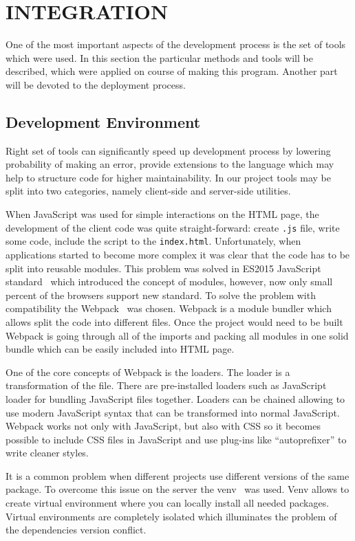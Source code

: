 \section{INTEGRATION}

One of the most important aspects of the development process is the set of tools which were
used. In this section the particular methods and tools will be described, which
were applied on course of making this program. Another part will be devoted to
the deployment process.

\subsection{Development Environment}

Right set of tools can significantly speed up development process by lowering probability of making
an error, provide extensions to the language which may help to structure code for higher
maintainability. In our project tools may be split into two categories, namely client-side and
server-side utilities.

When JavaScript was used for simple interactions on the HTML page, the development of the client
code was quite straight-forward: create \texttt{.js} file, write some code, include the script to
the \texttt{index.html}. Unfortunately, when applications started to become more complex it was
clear that the code has to be split into reusable modules. This problem was solved in ES2015
JavaScript standard~\cite{es2015} which introduced the concept of modules, however, now only small
percent of the browsers support new standard. To solve the problem with compatibility the
Webpack~\cite{webpack} was chosen. Webpack is a module bundler which allows split the code into
different files. Once the project would need to be built Webpack is going through all of the imports
and packing all modules in one solid bundle which can be easily included into HTML page.

One of the core concepts of Webpack is the loaders. The loader is a transformation
of the file. There are pre-installed loaders such as JavaScript loader for
bundling JavaScript files together. Loaders can be chained allowing to use modern
JavaScript syntax that can be transformed into normal JavaScript. Webpack
works not only with JavaScript, but also with CSS so it becomes possible to include
CSS files in JavaScript and use plug-ins like ``autoprefixer'' to write cleaner styles.

It is a common problem when different projects use different versions of the same package. To
overcome this issue on the server the venv~\cite{venv} was used. Venv allows to create virtual
environment where you can locally install all needed packages. Virtual environments are completely
isolated which illuminates the problem of the dependencies version conflict.

